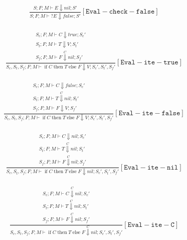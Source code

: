 \documentclass{scrartcl}
\DeclareMathOperator{\ifop}{if}
\DeclareMathOperator{\thenop}{then}
\DeclareMathOperator{\elseop}{else}
\begin{document}
    \begin{align*}
    \frac{
        S; F; M \vdash E \Downarrow nil; S'
    }{
        S; F; M \vdash ?E \Downarrow false; S'
    }[\mathtt{Eval-check-false}]
    \end{align*}
    
    \begin{align*}
    \frac{
        \begin{matrix}
        S_c; F; M \vdash C \Downarrow true; S_c' \\
        S_t; F; M \vdash T \Downarrow V; S_t' \\
        S_f; F; M \vdash F \overset{C}{\Downarrow} nil; S_f'
        \end{matrix}
    }{
        S_c, S_t, S_f; F; M \vdash \ifop C \thenop T \elseop F \Downarrow V; S_c', S_t', S_f'
    }[\mathtt{Eval-ite-true}]
    \end{align*}
    
    \begin{align*}
    \frac{
        \begin{matrix}
        S_c; F; M \vdash C \Downarrow false; S_c' \\
        S_t; F; M \vdash T \overset{C}{\Downarrow} nil; S_t' \\
        S_f; F; M \vdash F \Downarrow V; S_f'
        \end{matrix}
    }{
        S_c, S_t, S_f; F; M \vdash \ifop C \thenop T \elseop F \Downarrow V; S_c', S_t', S_f'
    }[\mathtt{Eval-ite-false}]
    \end{align*}
    
    \begin{align*}
    \frac{
        \begin{matrix}
        S_c; F; M \vdash C \Downarrow nil; S_c' \\
        S_t; F; M \vdash T \overset{C}{\Downarrow} nil; S_t' \\
        S_f; F; M \vdash F \overset{C}{\Downarrow} nil; S_f'
        \end{matrix}
    }{
        S_c, S_t, S_f; F; M \vdash \ifop C \thenop T \elseop F \Downarrow nil; S_c', S_t', S_f'
    }[\mathtt{Eval-ite-nil}]
    \end{align*}
    
    \begin{align*}
    \frac{
        \begin{matrix}
        S_c; F; M \vdash C \overset{C}{\Downarrow} nil; S_c' \\
        S_t; F; M \vdash T \overset{C}{\Downarrow} nil; S_t' \\
        S_f; F; M \vdash F \overset{C}{\Downarrow} nil; S_f'
        \end{matrix}
    }{
        S_c, S_t, S_f; F; M \vdash \ifop C \thenop T \elseop F \overset{C}{\Downarrow} nil; S_c', S_t', S_f'
    }[\mathtt{Eval-ite-C}]
    \end{align*}
    
\end{document}
